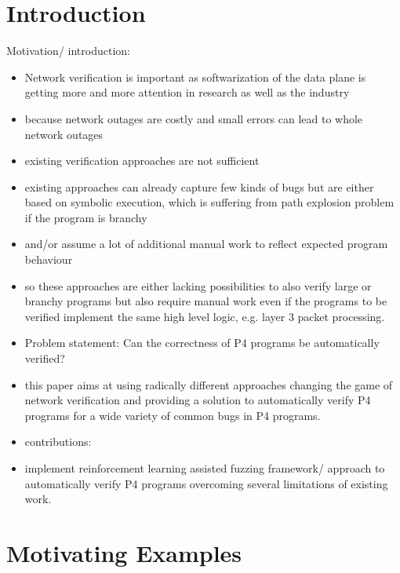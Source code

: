 \section{Introduction}


Motivation/ introduction:
\begin{itemize}
    \item Network verification is important as softwarization of the data plane is getting more and more attention in research as well as the industry
    \item because network outages are costly and small errors can lead to whole network outages
    \item existing verification approaches are not sufficient
    \item existing approaches can already capture few kinds of bugs but are either based on symbolic execution, which is suffering from path explosion problem if the program is branchy
    \item and/or assume a lot of additional manual work to reflect expected program behaviour
    \item so these approaches are either lacking possibilities to also verify large or branchy programs but also require manual work even if the programs to be verified implement the same high level logic, e.g. layer 3 packet processing.
    \item Problem statement: Can the correctness of P4 programs be automatically verified?
    \item this paper aims at using radically different approaches changing the game of network verification and providing a solution to automatically verify P4 programs for a wide variety of common bugs in P4 programs.
    \item contributions: 
    \item implement reinforcement learning assisted fuzzing framework/ approach to automatically verify P4 programs overcoming several limitations of existing work.
    
\end{itemize}
\section{Motivating Examples}

